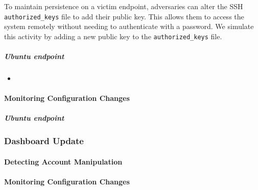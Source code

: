 To maintain persistence on a victim endpoint, adversaries can alter the SSH \texttt{authorized\_keys} file to add their public key. This allows them to access the system remotely without needing to authenticate with a password. We simulate this activity by adding a new public key to the \texttt{authorized\_keys} file.

\subparagraph{Ubuntu endpoint}
\begin{itemize}
    \item
\end{itemize}


\paragraph{Monitoring Configuration Changes}
\subparagraph{Ubuntu endpoint}


\subsubsection{Dashboard Update}
\paragraph{Detecting Account Manipulation}
\paragraph{Monitoring Configuration Changes}
